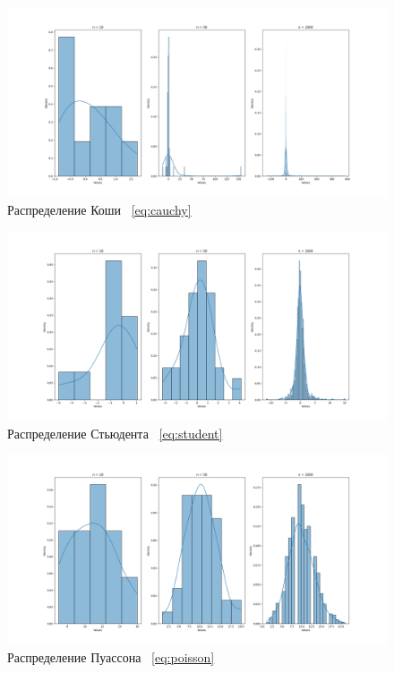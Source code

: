 \documentclass[12pt,a4paper]{article}
\begin{document}
	\begin{figure}[htbp!]
		\begin{center}
			\includegraphics[width = 1.12\linewidth]{graphics/lab1_cauchy.png}
			\caption{Распределение Коши \ \eqref{eq:cauchy}}
		\end{center}
	\end{figure}

	\newpage

	\begin{figure}[htbp!]
		\begin{center}
			\includegraphics[width = 1.12\linewidth]{graphics/lab1_student.png}
			\caption{Распределение Стьюдента \ \eqref{eq:student}}
		\end{center}
	\end{figure}

	\begin{figure}[htbp!]
		\begin{center}
			\includegraphics[width = 1.12\linewidth]{graphics/lab1_poisson.png}
			\caption{Распределение Пуассона \ \eqref{eq:poisson}}
		\end{center}
	\end{figure}
\end{document}
